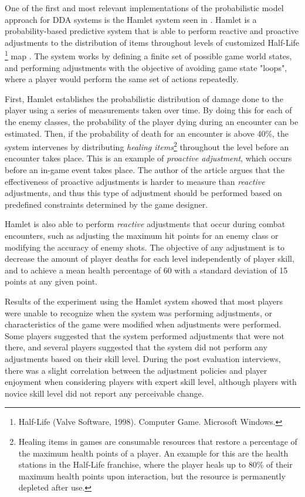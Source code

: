 One of the first and most relevant implementations of the probabilistic model approach for DDA systems is the Hamlet system seen in \cite{article_casefordynamicdifficulty}. Hamlet is a probability-based predictive system that is able to perform reactive and proactive adjustments to the distribution of items throughout levels of customized Half-Life \footnote{Half-Life (Valve Software, 1998). Computer Game. Microsoft Windows.} map \cite{article_casefordynamicdifficulty}. The system works by defining a finite set of possible game world states, and performing adjustments with the objective of avoiding game state "loops", where a player would perform the same set of actions repeatedly.

First, Hamlet establishes the probabilistic distribution of damage done to the player using a series of measurements taken over time. By doing this for each of the enemy classes, the probability of the player dying during an encounter can be estimated. Then, if the probability of death for an encounter is above 40\%, the system intervenes by distributing \emph{healing items}\footnote{Healing items in games are consumable resources that restore a percentage of the maximum health points of a player. An example for this are the health stations in the Half-Life franchise, where the player heals up to 80\% of their maximum health points upon interaction, but the resource is permanently depleted after use.} throughout the level before an encounter takes place. This is an example of \emph{proactive adjustment}, which occurs before an in-game event takes place. The author of the article argues that the effectiveness of proactive adjustments is harder to measure than \emph{reactive} adjustments, and thus this type of adjustment should be performed based on predefined constraints determined by the game designer.

Hamlet is also able to perform \emph{reactive} adjustments that occur during combat encounters, such as adjusting the maximum hit points for an enemy class or modifying the accuracy of enemy shots. The objective of any adjustment is to decrease the amount of player deaths for each level independently of player skill, and to achieve a mean health percentage of 60 with a standard deviation of 15 points at any given point.

Results of the experiment using the Hamlet system showed that most players were unable to recognize when the system was performing adjustments, or characteristics of the game were modified when adjustments were performed. Some players suggested that the system performed adjustments that were not there, and several players suggested that the system did not perform any adjustments based on their skill level. During the post evaluation interviews, there was a slight correlation between the adjustment policies and player enjoyment when considering players with expert skill level, although players with novice skill level did not report any perceivable change.

